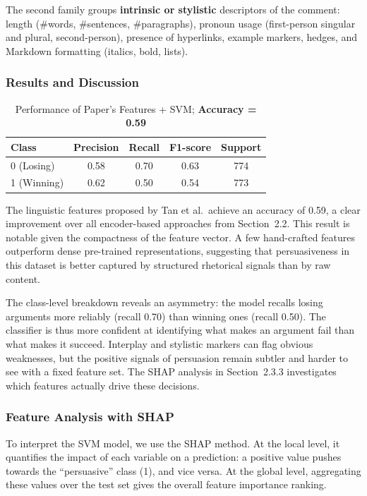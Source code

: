 \documentclass[11pt,a4paper]{article}
\begin{document}
The second family groups \textbf{intrinsic or stylistic} descriptors of the comment:
length (\#words, \#sentences, \#paragraphs), pronoun usage (first-person
singular and plural, second-person), presence of hyperlinks, example markers,
hedges, and Markdown formatting (italics, bold, lists).

\subsubsection{Results and Discussion}


\begin{table}[h]
\centering
\begin{tabular}{lcccc}
\toprule
\textbf{Class} & \textbf{Precision} & \textbf{Recall} & \textbf{F1-score} & \textbf{Support} \\
\midrule
0 (Losing) & 0.58 & 0.70 & 0.63 & 774 \\
1 (Winning)     & 0.62 & 0.50 & 0.54 & 773 \\
\bottomrule
\end{tabular}
\caption{Performance of Paper's Features + SVM; \textbf{Accuracy = 0.59}}
\label{tab:features_svm}
\end{table}

The linguistic features proposed by Tan et al.\ achieve an accuracy of 0.59, 
a clear improvement over all encoder-based approaches from Section~2.2. 
This result is notable given the compactness of the feature vector. A few hand-crafted features outperform dense pre-trained representations, 
suggesting that persuasiveness in this dataset is better captured by structured rhetorical signals than by raw content.

The class-level breakdown reveals an asymmetry: the model recalls losing arguments more reliably (recall 0.70) than winning ones (recall 0.50). The classifier is thus more confident at identifying what makes an argument fail than what makes it succeed. Interplay and stylistic markers can flag obvious weaknesses, but the positive signals of persuasion remain subtler and harder to see with a fixed feature set. The SHAP analysis in Section~2.3.3 investigates which features actually drive these decisions.


\subsubsection{Feature Analysis with SHAP}

To interpret the SVM model, we use the SHAP method. At the local level, it
quantifies the impact of each variable on a prediction: a positive value
pushes towards the ``persuasive'' class (1), and vice versa. At the global
level, aggregating these values over the test set gives the overall feature
importance ranking.
\end{document}
